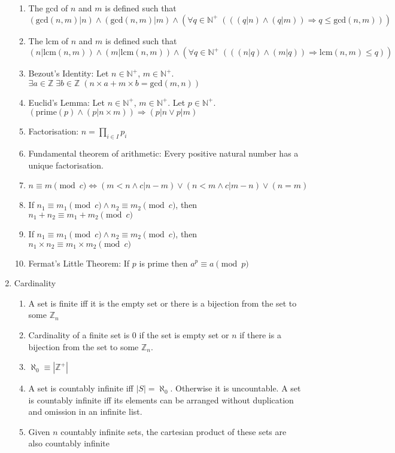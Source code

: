 \documentclass[11pt, twocolumn]{article}
\theoremstyle{definition} \newtheorem*{solution}{Solution}
\begin{document}
\begin{enumerate}
\begin{enumerate}
\item The gcd of $n$ and $m$ is defined such that $(\text{gcd}(n, m) |n) \wedge (\text{gcd}(n,m) |m)\wedge (\forall q\in \mathbb{N}^+ \;(((q|n)\wedge (q|m))\Rightarrow q\leq \text{gcd}(n,m)))$
\item The lcm of $n$ and $m$ is defined such that $(n|\text{lcm}(n, m)) \wedge (m|\text{lcm}(n,m))\wedge (\forall q\in \mathbb{N}^+ \;(((n|q)\wedge (m|q))\Rightarrow \text{lcm}(n,m)\leq q))$
\item Bezout's Identity: Let $n \in \mathbb{N}^+$, $m \in \mathbb{N}^+$. $\exists a \in \mathbb{Z} \; \exists b\in \mathbb{Z} \; (n\times a + m\times b = \text{gcd}(m,n))$
\item Euclid's Lemma: Let $n \in \mathbb{N}^+$, $m \in \mathbb{N}^+$. Let $p\in \mathbb{N}^+$. $(\text{prime}(p)\wedge (p|n\times m))\Rightarrow (p|n \vee p|m)$
\item Factorisation: $n = \prod_{i\in I} p_i$
\item Fundamental theorem of arithmetic: Every positive natural number has a unique factorisation.
\item $n \equiv m \pmod{c} \Leftrightarrow (m<n\wedge c|n-m)\vee (n<m\wedge c|m-n)\vee (n=m)$
\item If $n_1\equiv m_1 \pmod{c} \wedge n_2 \equiv m_2 \pmod{c}$, then $n_1+n_2 \equiv m_1+m_2 \pmod{c}$
\item If $n_1\equiv m_1 \pmod{c} \wedge n_2 \equiv m_2 \pmod{c}$, then $n_1\times n_2 \equiv m_1\times m_2 \pmod{c}$
\item Fermat's Little Theorem: If $p$ is prime then $a^p\equiv a\pmod{p}$
\end{enumerate}
\item Cardinality
\begin{enumerate}
\item A set is finite iff it is the empty set or there is a bijection from the set to some $\mathbb{Z}_n$
\item Cardinality of a finite set is 0 if the set is empty set or $n$ if there is a bijection from the set to some $\mathbb{Z}_n$.
\item $\aleph_0 \equiv |\mathbb{Z}^+|$
\item A set is countably infinite iff $|S| = \aleph_0$. Otherwise it is uncountable. A set is countably infinite iff its elements can be arranged without duplication and omission in an infinite list.
\item Given $n$ countably infinite sets, the cartesian product of these sets are also countably infinite

\end{enumerate}
\end{enumerate}
\end{document}
